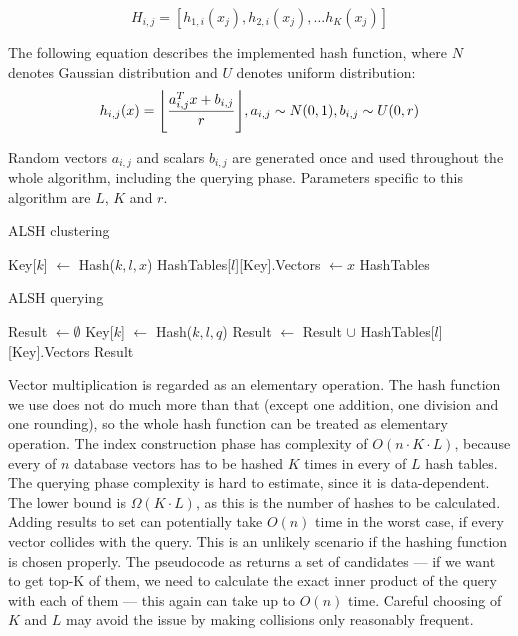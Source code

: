 $$H_{i,j} = [h_{1,i}(x_j), h_{2,i}(x_j), \dots h_K(x_j)]$$

The following equation describes the implemented hash function, where
$N$ denotes Gaussian distribution and $U$ denotes uniform distribution:
\begin{equation*}
h_{i,j}(x) = \floor*{\frac{a_{i,j}^T x + b_{i,j}}{r}}, a_{i,j} \sim N(0,1), b_{i,j} \sim U(0,r)
\end{equation*}
\par
Random vectors $a_{i,j}$ and scalars $b_{i,j}$ are generated once and used throughout the whole
algorithm, including the querying phase. Parameters specific to this algorithm are $L$, $K$ and $r$.

\begin{algorithm}
	\caption{ALSH clustering}
	\begin{algorithmic}
				\State Key[$k$] $\gets$ Hash($k, l, x$)
			\EndFor
			\State HashTables[$l$][Key].Vectors $\gets x$
		\EndFor
		\State \Return HashTables
	\end{algorithmic}
\end{algorithm}

\begin{algorithm}
	\caption{ALSH querying}
	\begin{algorithmic}
		\State Result $\gets \emptyset$
		\For{$l = 0, 1, \dots, L$}
			\For{$k = 0, 1, \dots, K$}
				\State Key[$k$] $\gets$ Hash($k, l, q$)
			\EndFor
			\State Result $\gets$ Result $\cup$ HashTables[$l$][Key].Vectors
		\EndFor
		\State \Return Result
	\end{algorithmic}
\end{algorithm}

Vector multiplication is regarded as an elementary operation.
The hash function we use does not do much more than that (except one addition,
one division and one rounding),
so the whole hash function can be treated as elementary operation.
The index construction phase has complexity of $O(n \cdot K \cdot L)$,
because every of $n$ database vectors
has to be hashed $K$ times in every of $L$ hash tables.
The querying phase complexity is hard to estimate, since it is data-dependent.
The lower bound is $\Omega(K \cdot L)$, as this is the number of hashes to be
calculated. Adding results to set can potentially take $O(n)$ time in the worst
case, if every vector collides with the query. This is an unlikely scenario if
the hashing function is chosen properly. The pseudocode as  returns a set
of candidates --- if we want to get top-K of them, we need to calculate the exact
inner product of the query with each of them --- this again can take up to
$O(n)$ time. Careful choosing of $K$ and $L$ may avoid the issue
by making collisions only reasonably frequent.

